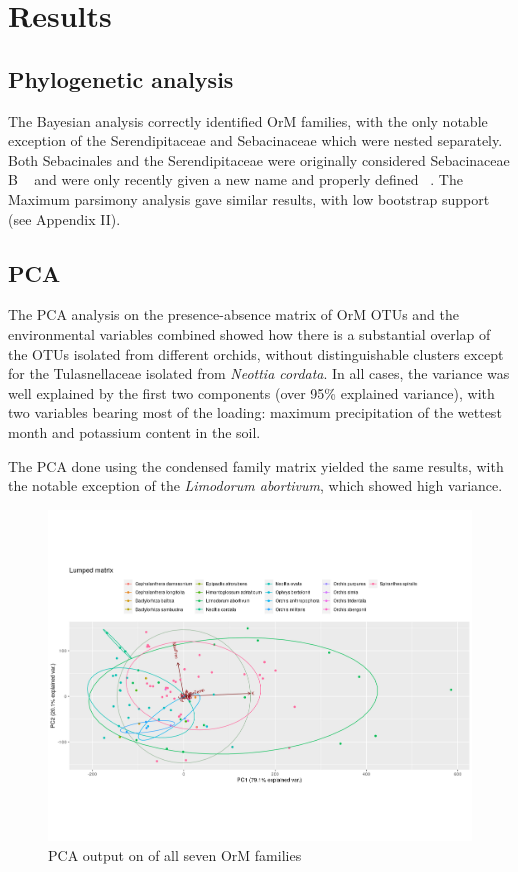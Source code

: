\part{Results}
\label{results}

\chapter{Phylogenetic analysis}
\label{phylogeneticanalysis}

The Bayesian analysis correctly identified OrM families, with the only notable exception of the Serendipitaceae and Sebacinaceae which were nested separately. Both Sebacinales and the Serendipitaceae were originally considered Sebacinaceae B ~\citep{weiss2004} and were only recently given a new name and properly defined ~\citep{weiss2016}.
The Maximum parsimony analysis gave similar results, with low bootstrap support (see Appendix II).

\chapter{PCA}
\label{pca}

The PCA analysis on the presence-absence matrix of OrM OTUs and the environmental variables combined showed how there is a substantial overlap of the OTUs isolated from different orchids, without distinguishable clusters except for the Tulasnellaceae isolated from \emph{Neottia cordata}.
In all cases, the variance was well explained by the first two components (over 95\% explained variance), with two variables bearing most of the loading: maximum precipitation of the wettest month and potassium content in the soil.

The PCA done using the condensed family matrix yielded the same results, with the notable exception of the \emph{Limodorum abortivum}, which showed high variance.

\begin{figure}[htbp]
\centering
\includegraphics[keepaspectratio,width=\textwidth,height=0.75\textheight]{images/lumpPCA.png}
\caption{PCA output on of all seven OrM families}
\end{figure}

